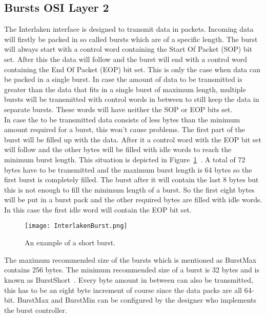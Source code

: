 \subsection[Bursts]{Bursts \hfill OSI Layer 2}
	\label{subsec:interlaken_bursts}
	The Interlaken interface is designed to transmit data in packets. Incoming data will firstly be packed in so called bursts which are of a specific length. The burst will always start with a control word containing the Start Of Packet (SOP) bit set. After this the data will follow and the burst will end with a control word containing the End Of Packet (EOP) bit set. This is only the case when data can be packed in a single burst. In case the amount of data to be transmitted is greater than the data that fits in a single burst of maximum length, multiple bursts will be transmitted with control words in between to still keep the data in separate bursts. These words will have neither the SOP or EOP bits set.\\
	
	In case the to be transmitted data consists of less bytes than the minimum amount required for a burst, this won't cause problems. The first part of the burst will be filled up with the data. After it a control word with the EOP bit set will follow and the other bytes will be filled with idle words to reach the minimum burst length. This situation is depicted in Figure~\ref{Fig:Interlaken_Burst}~\cite{InterlakenProtocol}. A total of 72 bytes have to be transmitted and the maximum burst length is 64 bytes so the first burst is completely filled. The burst after it will contain the last 8 bytes but this is not enough to fill the minimum length of a burst. So the first eight bytes will be put in a burst pack and the other required bytes are filled with idle words. In this case the first idle word will contain the EOP bit set.
	
	\begin{figure}[H]
		\centering
		\texttt{[image: InterlakenBurst.png]}	
		\caption{An example of a short burst.}
		\label{Fig:Interlaken_Burst}
	\end{figure}
	
	The maximum recommended size of the bursts which is mentioned as BurstMax contains 256 bytes. The minimum recommended size of a burst is 32 bytes and is known as BurstShort~\cite{InterlakenRecommendations}. Every byte amount in between can also be transmitted, this has to be an eight byte increment of course since the data packs are all 64-bit. BurstMax and BurstMin can be configured by the designer who implements the burst controller.\\
	
